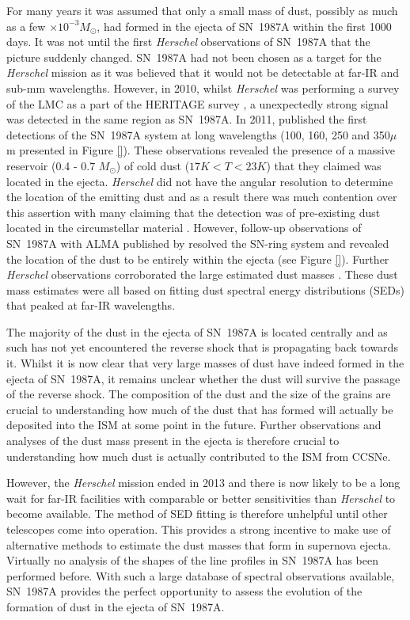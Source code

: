 For many years it was assumed that only a small mass of dust, possibly as much as a few $\times 10^{-3}M_{\odot}$, had formed in the ejecta of SN~1987A within the first 1000 days.  It was not until the first \textit{Herschel} observations of SN~1987A that the picture suddenly changed.  SN~1987A had not been chosen as a target for the \textit{Herschel} mission as it was believed that it would not be detectable at far-IR and sub-mm wavelengths.  However, in 2010, whilst \textit{Herschel} was performing a survey of the LMC as a part of the HERITAGE survey \citep{Meixner2013}, a unexpectedly strong signal was detected in the same region as SN~1987A.  In 2011, \citet{Matsuura2011} published the first detections of the SN~1987A system at long wavelengths (100, 160, 250 and 350$\mu$m presented in Figure \ref{}).  These observations revealed the presence of a massive reservoir (0.4 - 0.7 $M_{\odot}$) of cold dust ($17K<T<23K$) that they claimed was located in the ejecta.  \textit{Herschel} did not have the angular resolution to determine the location of the emitting dust and as a result there was much contention over this assertion with many claiming that the detection was of pre-existing dust located in the circumstellar material \citep{Bouchet2014}.  However, follow-up observations of SN~1987A with ALMA published by \citet{Indebetouw2014} resolved the SN-ring system and revealed the location of the dust to be entirely within the ejecta (see Figure \ref{}).  Further \textit{Herschel} observations corroborated the large estimated dust masses \citep{Matsuura2015}.  These dust mass estimates were all based on fitting dust spectral energy distributions (SEDs) that peaked at far-IR wavelengths.

The majority of the dust in the ejecta of SN~1987A is located centrally and as such has not yet encountered the reverse shock that is propagating back towards it.  Whilst it is now clear that very large masses of dust have indeed formed in the ejecta of SN~1987A, it remains unclear whether the dust will survive the passage of the reverse shock.  The composition of the dust and the size of the grains are crucial to understanding how much of the dust that has formed will actually be deposited into the ISM at some point in the future.  Further observations and analyses of the dust mass present in the ejecta is therefore crucial to understanding how much dust is actually contributed to the ISM from CCSNe.

 However, the {\em Herschel} mission ended in 2013 and there is now likely to be a long wait for far-IR facilities with comparable or better sensitivities than {\em Herschel} to become available.  The method of SED fitting is therefore unhelpful until other telescopes come into operation.  This provides a strong incentive to make use of alternative methods to estimate the dust masses that form in supernova ejecta.  Virtually no analysis of the shapes of the line profiles in SN~1987A has been performed before.  With such a large database of spectral observations available, SN~1987A provides the perfect opportunity to assess the evolution of the formation of dust in the ejecta of SN~1987A.  

